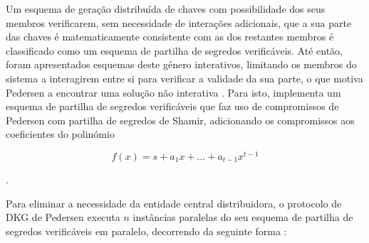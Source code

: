 Um esquema de geração distribuída de chaves com possibilidade dos seus membros verificarem, sem necessidade de interações adicionais, que a sua parte das chaves é matematicamente consistente com as dos restantes membros é classificado como um esquema de partilha de segredos verificáveis. Até então, foram apresentados esquemas deste género interativos, limitando os membros do sistema a interagirem entre si para verificar a validade da sua parte, o que motiva Pedersen a encontrar uma solução não interativa \cite{reaction_la_pedersen}. Para isto, implementa um esquema de partilha de segredos verificáveis que faz uso de compromissos de Pedersen com partilha de segredos de Shamir, adicionando os compromissos aos coeficientes do polinómio

\begin{equation*}
    f(x) = s + a_1x + \ldots + a_{t-1}x^{t-1}
\end{equation*}

\cite{reaction_la_pedersen}.

Para eliminar a necessidade da entidade central distribuidora, o protocolo de DKG de Pedersen executa $n$ instâncias paralelas do seu esquema de partilha de segredos verificáveis em paralelo, decorrendo da seguinte forma \cite{pedersen1991threshold}:

